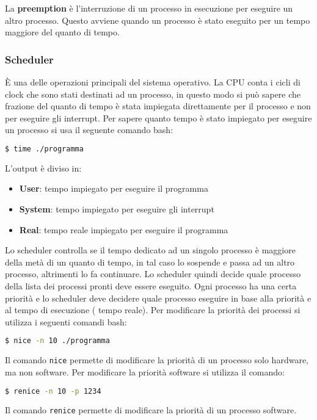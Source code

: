 \documentclass[a4paper]{article}
\theoremstyle{break}
\theoremstyle{break}
\theoremstyle{break}
\theoremstyle{break}
\begin{document}
\noindent La \textbf{preemption} è l'interruzione di un processo in esecuzione per
eseguire un altro processo. Questo avviene quando un processo è stato eseguito per
un tempo maggiore del quanto di tempo.

\subsubsection{Scheduler}
È una delle operazioni principali del sistema operativo. La CPU conta i cicli di clock
che sono stati destinati ad un processo, in questo modo si può sapere che frazione del
quanto di tempo è stata impiegata direttamente per il processo e non per eseguire gli
interrupt. Per sapere quanto tempo è stato impiegato per eseguire un processo si
usa il seguente comando bash:
\begin{lstlisting}[language=bash]
$ time ./programma
\end{lstlisting}
\noindent L'output è diviso in:
\begin{itemize}
	\item \textbf{User}: tempo impiegato per eseguire il programma
	\item \textbf{System}: tempo impiegato per eseguire gli interrupt
	\item \textbf{Real}: tempo reale impiegato per eseguire il programma
\end{itemize}

\vspace{1em}
\noindent Lo scheduler controlla se il tempo dedicato ad un singolo processo è maggiore
della metà di un quanto di tempo, in tal caso lo sospende e passa ad un altro processo,
altrimenti lo fa continuare. Lo scheduler quindi decide quale processo della lista dei
processi pronti deve essere eseguito. Ogni processo ha una certa priorità e lo scheduler
deve decidere quale processo eseguire in base alla priorità e al tempo di esecuzione (
tempo reale). Per modificare la priorità dei processi si utilizza i seguenti comandi bash:
\begin{lstlisting}[language=bash]
$ nice -n 10 ./programma
\end{lstlisting}
\noindent Il comando \texttt{nice} permette di modificare la priorità di un processo solo
hardware, ma non software. Per modificare la priorità software si utilizza il comando:
\begin{lstlisting}[language=bash]
$ renice -n 10 -p 1234
\end{lstlisting}
\noindent Il comando \texttt{renice} permette di modificare la priorità di un processo
software.
\end{document}
